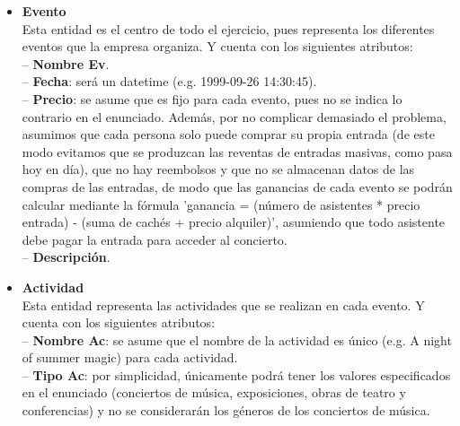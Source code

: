 \documentclass[12pt]{article}
\begin{document}
    \begin{itemize}

        \item \textbf{Evento}\\
            Esta entidad es el centro de todo el ejercicio, pues representa los diferentes eventos que la empresa organiza.
            Y cuenta con los siguientes atributos: \\
                \hspace{0.5cm} -- {\bfseries Nombre Ev}. \\
                \hspace{0.5cm} -- {\bfseries Fecha}: será un datetime (e.g. 1999-09-26 14:30:45). \\
                \hspace{0.5cm} -- {\bfseries Precio}: se asume que es fijo para cada evento, pues no se indica lo contrario en el enunciado. 
                Además, por no complicar demasiado el problema, asumimos que cada persona solo puede comprar su propia entrada (de este modo evitamos 
                que se produzcan las reventas de entradas masivas, como pasa hoy en día), que no hay reembolsos y que no se almacenan datos de las compras de 
                las entradas, de modo que las ganancias de cada evento se podrán calcular mediante la fórmula 
                'ganancia = (número de asistentes * precio entrada) - (suma de cachés + precio alquiler)', asumiendo que todo asistente debe pagar la entrada 
                para acceder al concierto. \\
                \hspace{0.5cm} -- {\bfseries Descripción}.

        \item \textbf{Actividad}\\
            Esta entidad representa las actividades que se realizan en cada evento. 
            Y cuenta con los siguientes atributos:\\
                \hspace{0.5cm} -- {\bfseries Nombre Ac}: se asume que el nombre de la actividad es único (e.g. A night of summer magic) para cada actividad. \\
                \hspace{0.5cm} -- {\bfseries Tipo Ac}: por simplicidad, únicamente podrá tener los valores especificados en el enunciado (conciertos de música, 
                exposiciones, obras de teatro y conferencias) y no se considerarán los géneros de los conciertos de música.


\end{itemize}
\end{document}
